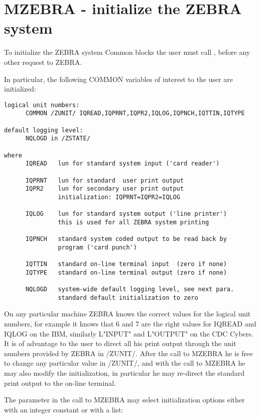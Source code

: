 \section{MZEBRA - initialize the ZEBRA system}

To initialize the ZEBRA system Common blocks the user must call
, before any other request to ZEBRA.

In particular, the following COMMON variables of interest to
the user are initialized:

\begin{verbatim}
logical unit numbers:
      COMMON /ZUNIT/ IQREAD,IQPRNT,IQPR2,IQLOG,IQPNCH,IQTTIN,IQTYPE

default logging level:
      NQLOGD in /ZSTATE/

where
      IQREAD   lun for standard system input ('card reader')

      IQPRNT   lun for standard  user print output
      IQPR2    lun for secondary user print output
               initialization: IQPRNT=IQPR2=IQLOG

      IQLOG    lun for standard system output ('line printer')
               this is used for all ZEBRA system printing

      IQPNCH   standard system coded output to be read back by
               program ('card punch')

      IQTTIN   standard on-line terminal input  (zero if none)
      IQTYPE   standard on-line terminal output (zero if none)

      NQLOGD   system-wide default logging level, see next para.
               standard default initialization to zero
\end{verbatim} 

On any particular machine ZEBRA knows the correct values for
the logical unit numbers, for example it knows that 6 and 7
are the right values for IQREAD and IQLOG on the IBM,
similarly  L"INPUT" and L"OUTPUT"  on the CDC Cybers.
It is of advantage to the user to direct all his print output
through the unit numbers provided by ZEBRA in /ZUNIT/.
After the call to MZEBRA he is free to change any particular
value in /ZUNIT/, and with the call to MZEBRA he may also
modify the initialization, in particular he may re-direct
the standard print output to the on-line terminal.

The parameter in the call to MZEBRA may select initialization
options either with an integer constant or with a list:

